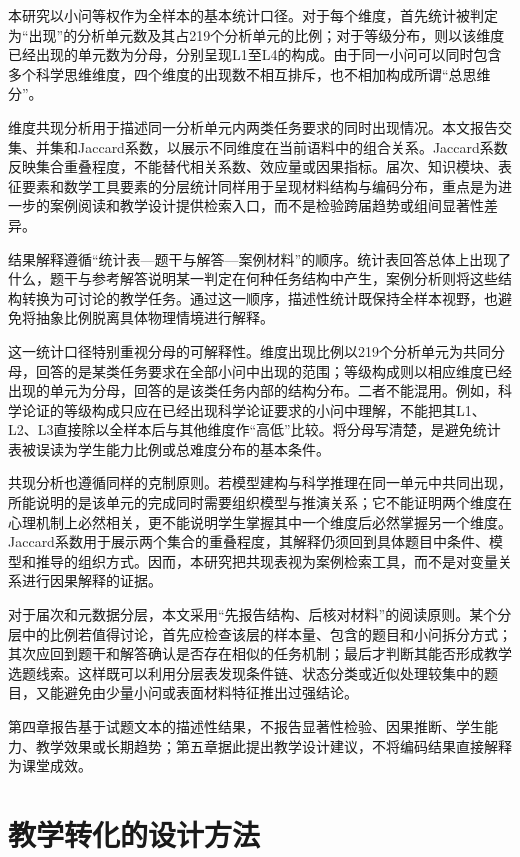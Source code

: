 \documentclass[
  12pt,
  a4paper]{ctexbook}
\begin{document}
本研究以小问等权作为全样本的基本统计口径。对于每个维度，首先统计被判定为``出现''的分析单元数及其占219个分析单元的比例；对于等级分布，则以该维度已经出现的单元数为分母，分别呈现L1至L4的构成。由于同一小问可以同时包含多个科学思维维度，四个维度的出现数不相互排斥，也不相加构成所谓``总思维分''。

维度共现分析用于描述同一分析单元内两类任务要求的同时出现情况。本文报告交集、并集和Jaccard系数，以展示不同维度在当前语料中的组合关系。Jaccard系数反映集合重叠程度，不能替代相关系数、效应量或因果指标。届次、知识模块、表征要素和数学工具要素的分层统计同样用于呈现材料结构与编码分布，重点是为进一步的案例阅读和教学设计提供检索入口，而不是检验跨届趋势或组间显著性差异。

结果解释遵循``统计表---题干与解答---案例材料''的顺序。统计表回答总体上出现了什么，题干与参考解答说明某一判定在何种任务结构中产生，案例分析则将这些结构转换为可讨论的教学任务。通过这一顺序，描述性统计既保持全样本视野，也避免将抽象比例脱离具体物理情境进行解释。

这一统计口径特别重视分母的可解释性。维度出现比例以219个分析单元为共同分母，回答的是某类任务要求在全部小问中出现的范围；等级构成则以相应维度已经出现的单元为分母，回答的是该类任务内部的结构分布。二者不能混用。例如，科学论证的等级构成只应在已经出现科学论证要求的小问中理解，不能把其L1、L2、L3直接除以全样本后与其他维度作``高低''比较。将分母写清楚，是避免统计表被误读为学生能力比例或总难度分布的基本条件。

共现分析也遵循同样的克制原则。若模型建构与科学推理在同一单元中共同出现，所能说明的是该单元的完成同时需要组织模型与推演关系；它不能证明两个维度在心理机制上必然相关，更不能说明学生掌握其中一个维度后必然掌握另一个维度。Jaccard系数用于展示两个集合的重叠程度，其解释仍须回到具体题目中条件、模型和推导的组织方式。因而，本研究把共现表视为案例检索工具，而不是对变量关系进行因果解释的证据。

对于届次和元数据分层，本文采用``先报告结构、后核对材料''的阅读原则。某个分层中的比例若值得讨论，首先应检查该层的样本量、包含的题目和小问拆分方式；其次应回到题干和解答确认是否存在相似的任务机制；最后才判断其能否形成教学选题线索。这样既可以利用分层表发现条件链、状态分类或近似处理较集中的题目，又能避免由少量小问或表面材料特征推出过强结论。

第四章报告基于试题文本的描述性结果，不报告显著性检验、因果推断、学生能力、教学效果或长期趋势；第五章据此提出教学设计建议，不将编码结果直接解释为课堂成效。

\section{教学转化的设计方法}\label{ux6559ux5b66ux8f6cux5316ux7684ux8bbeux8ba1ux65b9ux6cd5}
\end{document}
